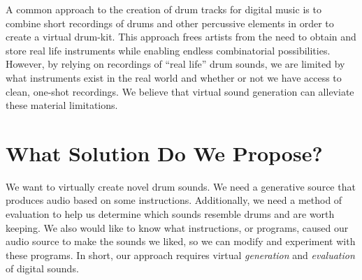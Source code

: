 \documentclass[\main/thesis.tex]{subfiles}
\begin{document}
A common approach to the creation of drum tracks for digital music is to combine short recordings of drums and other percussive elements in order to create a virtual drum-kit. This approach frees artists from the need to obtain and store real life instruments while enabling endless combinatorial possibilities. However, by relying on recordings of \enquote{real life} drum sounds, we are limited by what instruments exist in the real world and whether or not we have access to clean, one-shot recordings. We believe that virtual sound generation can alleviate these material limitations. 
 
\section{What Solution Do We Propose?}
\label{sec:sol_propose}
We want to virtually create novel drum sounds. We need a generative source that produces audio based on some instructions. Additionally, we need a method of evaluation to help us determine which sounds resemble drums and are worth keeping. We also would like to know what instructions, or programs, caused our audio source to make the sounds we liked, so we can modify and experiment with these programs. In short, our approach requires virtual \textit{generation} and \textit{evaluation} of digital sounds.   
\end{document}
